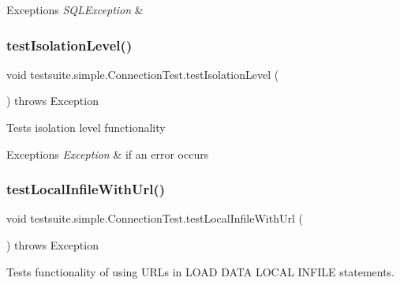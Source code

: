 \begin{DoxyExceptions}{Exceptions}
{\em S\+Q\+L\+Exception} & \\
\hline
\end{DoxyExceptions}
\mbox{\label{classtestsuite_1_1simple_1_1_connection_test_a021e6d2e50117ac6af546f9f340e2127}} 
\subsubsection{\texorpdfstring{test\+Isolation\+Level()}{testIsolationLevel()}}
{\footnotesize\ttfamily void testsuite.\+simple.\+Connection\+Test.\+test\+Isolation\+Level (\begin{DoxyParamCaption}{ }\end{DoxyParamCaption}) throws Exception}

Tests isolation level functionality


\begin{DoxyExceptions}{Exceptions}
{\em Exception} & if an error occurs \\
\hline
\end{DoxyExceptions}
\mbox{\label{classtestsuite_1_1simple_1_1_connection_test_aeb62fe06a5c144213319846e29ad17f5}} 
\subsubsection{\texorpdfstring{test\+Local\+Infile\+With\+Url()}{testLocalInfileWithUrl()}}
{\footnotesize\ttfamily void testsuite.\+simple.\+Connection\+Test.\+test\+Local\+Infile\+With\+Url (\begin{DoxyParamCaption}{ }\end{DoxyParamCaption}) throws Exception}

Tests functionality of using U\+R\+Ls in \textquotesingle{}L\+O\+AD D\+A\+TA L\+O\+C\+AL I\+N\+F\+I\+LE\textquotesingle{} statements.


